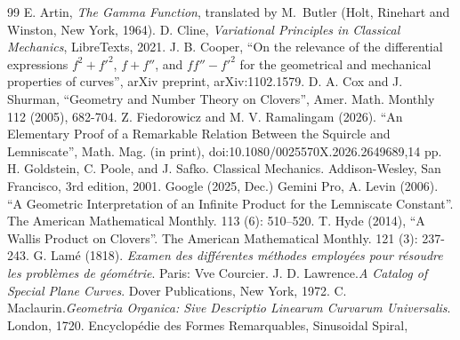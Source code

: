 \documentclass{amsart}
\theoremstyle{definition}
\begin{document}
\begin{thebibliography}{99}
 E. Artin, \textit{The Gamma Function}, translated by M.~Butler (Holt, Rinehart and Winston, New York, 1964).
D. Cline, \textit{Variational Principles in Classical Mechanics}, LibreTexts, 2021. \href{https://phys.libretexts.org/Bookshelves/Classical_Mechanics/Variational_Principles_in_Classical_Mechanics_(Cline)/11\%3A_Conservative_two-body_Central_Forces/11.05\%3A_Differential_Orbit_Equation?readerView}{\faExternalLink*}
J. B. Cooper, ``On the relevance of the differential expressions $f^2+f'^2$, $f+f''$,  and $ff''-f'^2$ for the geometrical and mechanical properties of curves'', arXiv preprint, arXiv:1102.1579. \href{https://arxiv.org/abs/1102.1579}{\faExternalLink*}
D. A. Cox and J. Shurman, ``Geometry and Number Theory on Clovers'', Amer. Math. Monthly 112 (2005), 682-704.
Z. Fiedorowicz and M. V. Ramalingam (2026). ``An Elementary Proof of a Remarkable Relation Between the Squircle and Lemniscate'', Math. Mag. (in print), doi:10.1080/0025570X.2026.2649689,14 pp. \href{https://doi.org/10.1080/0025570X.2026.2649689}{\faExternalLink*}
 H. Goldstein, C. Poole, and J. Safko. Classical Mechanics. Addison-Wesley, San Francisco, 3rd edition, 2001.
 Google (2025, Dec.) Gemini Pro, \href{https://gemini.google.com}{\faExternalLink*}
 A. Levin (2006). ``A Geometric Interpretation of an Infinite Product for the Lemniscate Constant''. The American Mathematical Monthly. 113 (6): 510–520. \href{https://web.archive.org/web/20041220213524id_/http://math.berkeley.edu:80/~adlevin/Lemniscate.pdf}{\faExternalLink*}
 T. Hyde (2014), ``A Wallis Product on Clovers''. The American Mathematical Monthly. 121 (3): 237-243.
\href{https://arxiv.org/pdf/1212.4178}{\faExternalLink*}
 G. Lam\'e (1818). \textit{Examen des diff\'erentes m\'ethodes employ\'ees pour r\'esoudre les probl\`emes de g\'eom\'etrie}. Paris: Vve Courcier. \href{https://archive.org/details/examendesdiffr00lamuoft/}{\faExternalLink*}
 J. D. Lawrence.\textit{A Catalog of Special Plane Curves}. Dover Publications, New York, 1972.
\href{https://archive.org/details/catalogofspecial0000lawr}{\faExternalLink*}
 C. Maclaurin.\textit{Geometria Organica: Sive Descriptio Linearum Curvarum Universalis}. London, 1720.\href{https://archive.org/details/geometriaorgani00maclgoog}{\faExternalLink*}
 Encyclop\'edie des Formes Remarquables, Sinusoidal Spiral,\href{https://mathcurve.com/courbes2d.gb/spiralesinusoidale/spiralesinusoidale.shtml}{\faExternalLink*}

\end{thebibliography}
\end{document}
